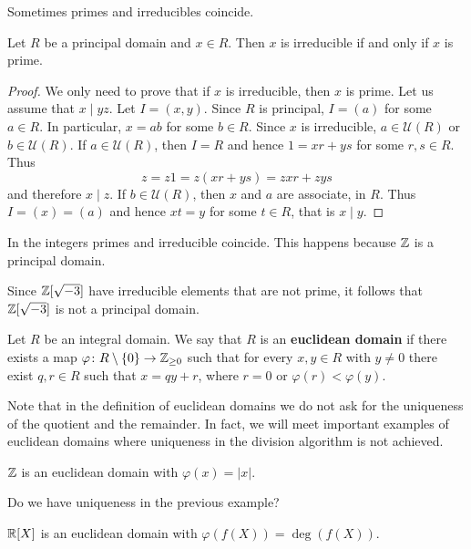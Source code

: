 Sometimes primes and irreducibles coincide. 

\begin{proposition}
	Let $R$ be a principal domain and $x\in R$. 
	Then $x$ is irreducible if and only if $x$ is prime. 	
\end{proposition}

\begin{proof}
	We only need to prove that if $x$ is irreducible, then $x$ is prime. Let us
	assume that $x\mid yz$. Let $I=(x,y)$. Since $R$ is principal, $I=(a)$ for some $a\in R$. In particular, $x=ab$ for some $b\in R$. Since $x$ is irreducible, $a\in\mathcal{U}(R)$ or
	$b\in\mathcal{U}(R)$. If $a\in\mathcal{U}(R)$, then $I=R$ and hence 
	$1=xr+ys$ for some $r,s\in R$. Thus
	\[
	z=z1=z(xr+ys)=zxr+zys
	\]
	and therefore $x\mid z$. If $b\in\mathcal{U}(R)$, then $x$ and $a$ are associate, 
	in $R$. Thus $I=(x)=(a)$ and hence $xt=y$ for some $t\in R$, that is $x\mid y$.  
\end{proof}

In the integers primes and irreducible coincide. This happens 
because $\mathbb{Z}$ is a principal domain.

\begin{example}
	Since $\mathbb{Z}[\sqrt{-3}]$ have irreducible elements that are not prime, it follows that
	$\mathbb{Z}[\sqrt{-3}]$ is not a principal domain.
\end{example}

\begin{definition}
	Let $R$ be an integral domain. We say that $R$ is an \textbf{euclidean domain}
	if there exists a map $\varphi\colon R\setminus\{0\}\to\mathbb{Z}_{\geq0}$ such that
	for every $x,y\in R$ with $y\ne 0$ there exist $q,r\in R$ such that 
	$x=qy+r$, where $r=0$ or $\varphi(r)<\varphi(y)$. 
\end{definition}

Note that in the definition of euclidean domains we do not ask for the uniqueness 
of the quotient and the remainder. In fact, 
we will meet important examples of euclidean domains where uniqueness
in the division algorithm is not achieved. 

\begin{example}
	$\mathbb{Z}$ is an euclidean domain with $\varphi(x)=|x|$.
\end{example}

Do we have uniqueness in the previous example? 	

\begin{example}
	$\mathbb{R}[X]$ is an euclidean domain with $\varphi(f(X))=\deg(f(X))$. 	
\end{example}

